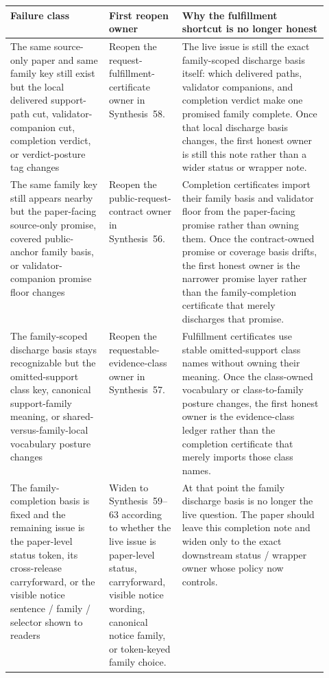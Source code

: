 \documentclass[11pt]{article}
\begin{document}
\begin{table}[t]
\centering
\small
\begin{tabularx}{\linewidth}{@{}p{0.31\linewidth}p{0.23\linewidth}X@{}}
\toprule
Failure class & First reopen owner & Why the fulfillment shortcut is no longer honest \\
\midrule
The same source-only paper and same family key still exist but the local delivered support-path cut, validator-companion cut, completion verdict, or verdict-posture tag changes & Reopen the request-fulfillment-certificate owner in Synthesis~58. & The live issue is still the exact family-scoped discharge basis itself: which delivered paths, validator companions, and completion verdict make one promised family complete. Once that local discharge basis changes, the first honest owner is still this note rather than a wider status or wrapper note. \\
The same family key still appears nearby but the paper-facing source-only promise, covered public-anchor family basis, or validator-companion promise floor changes & Reopen the public-request-contract owner in Synthesis~56. & Completion certificates import their family basis and validator floor from the paper-facing promise rather than owning them. Once the contract-owned promise or coverage basis drifts, the first honest owner is the narrower promise layer rather than the family-completion certificate that merely discharges that promise. \\
The family-scoped discharge basis stays recognizable but the omitted-support class key, canonical support-family meaning, or shared-versus-family-local vocabulary posture changes & Reopen the requestable-evidence-class owner in Synthesis~57. & Fulfillment certificates use stable omitted-support class names without owning their meaning. Once the class-owned vocabulary or class-to-family posture changes, the first honest owner is the evidence-class ledger rather than the completion certificate that merely imports those class names. \\
The family-completion basis is fixed and the remaining issue is the paper-level status token, its cross-release carryforward, or the visible notice sentence / family / selector shown to readers & Widen to Synthesis~59--63 according to whether the live issue is paper-level status, carryforward, visible notice wording, canonical notice family, or token-keyed family choice. & At that point the family discharge basis is no longer the live question. The paper should leave this completion note and widen only to the exact downstream status / wrapper owner whose policy now controls. \\

\end{tabularx}
\end{table}
\end{document}
